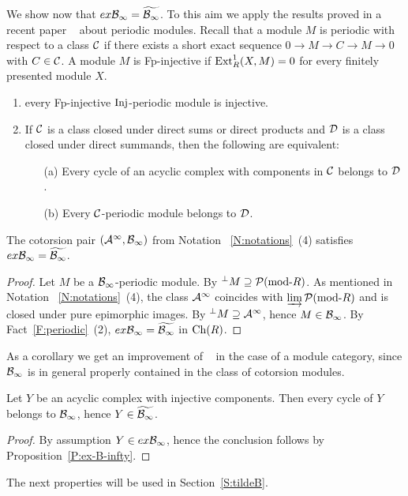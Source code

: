   We show now that $ex\mathcal{B}_{\infty}=\widetilde{\mathcal{B}_{\infty}}$. To this aim we apply the results proved in a recent paper ~\cite{BCIE} about periodic modules.
   Recall that a module $M$ is periodic with respect to a class $\mathcal{C}$ if there exists a short exact sequence $0\to M\to C\to M\to 0$ with $C\in \mathcal{C}$. A module $M$ is Fp-injective if $\operatorname{Ext}^1_R(X, M)=0$ for every finitely presented module $X$.

\begin{fact}\label{F:periodic}
 \begin{enumerate}
\item \cite[Proposition 3.8~(1)]{BCIE} every Fp-injective $\mathrm{Inj}$-periodic module is injective.
 \item \cite{EFI} If $\mathcal{C}$ is  a class closed under direct sums or direct products and  $\mathcal{D}$ is a class closed under direct summands, then the following are equivalent:
\begin{enumerate}
\item[(a)] Every cycle of an acyclic complex with components in $\mathcal{C}$ belongs to $\mathcal{D}$.
\item[(b)]  Every $\mathcal{C}$-periodic module belongs to $\mathcal{D}$.
\end{enumerate}

\end{enumerate}
\end{fact}

%
%
%
%
%
%
%
%
%
%
%
%

 \begin{prop}\label{P:ex-B-infty} The cotorsion pair $(\mathcal{A}^{\infty}, \mathcal{B}_{\infty})$ from Notation~
 \ref{N:notations}~(4) satisfies $ex\mathcal{B}_{\infty}=\widetilde{\mathcal{B}_{\infty}}$.
%
%
%
%
%
%
\end{prop}
%
\begin{proof}
  \begin{sloppypar}
  Let $M$ be a $\mathcal{B}_{\infty}$-periodic module. By \cite[Lemma 3.4]{BCIE} ${{}^\perp M\supseteq \mathcal{P}(\mathrm{mod}\textrm{-}R)}$. As mentioned in Notation~
 \ref{N:notations}~(4), the class  $\mathcal{A}^{\infty}$ coincides with $\varinjlim \mathcal{P}(\mathrm{mod}\textrm{-}R)$ and is closed under pure epimorphic images. By \cite[Theorem 3.7]{BCIE} ${}^\perp M\supseteq \mathcal{A}^{\infty}$, hence $M\in\mathcal{B}_{\infty}$. By Fact~\ref{F:periodic}~(2), $ex\mathcal{B}_{\infty}=\widetilde{\mathcal{B}_{\infty}}$ in $\mathrm{Ch}(R)$.
 \end{sloppypar}
  \end{proof}
%

As a corollary we get  an improvement of ~\cite[Corollary 5.9]{Stopurity} in the case of a module category, since $ \mathcal{B}_{\infty}$ is in general properly contained in the class of cotorsion modules.
\begin{cor}\label{C:exInj}
Let $Y$ be an acyclic complex with injective components. Then every cycle of $Y$ belongs to $ \mathcal{B}_{\infty}$, hence $Y\in \widetilde{ \mathcal{B}_{\infty}}$.
\end{cor}
%
\begin{proof} By assumption $Y\in ex\mathcal{B}_{\infty}$, hence the conclusion follows by Proposition~\ref{P:ex-B-infty}.
%
%
 \end{proof}
%
%
%
%
 The next properties will be used in Section~\ref{S:tildeB}.

